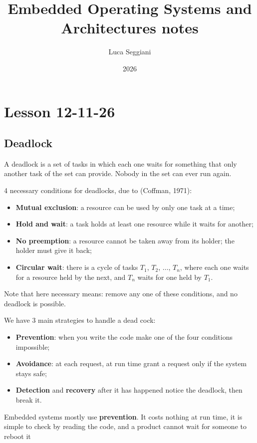 \documentclass[a4paper,11pt]{article}
\title{Embedded Operating Systems and Architectures notes}
\author{Luca Seggiani}
\date{2026}
\begin{document}
\section{Lesson 12-11-26}

\thispagestyle{empty}
\pagestyle{fancy}


\subsection{Deadlock}
A deadlock is a set of tasks in which each one waits for something that only another task of the set can provide.
Nobody in the set can ever run again.

4 necessary conditions for deadlocks, due to (Coffman, 1971):
\begin{itemize}
	\item \textbf{Mutual exclusion}: a resource can be used by only one task at a time;
	\item \textbf{Hold and wait}: a task holds at least one resource while it waits for another;
	\item \textbf{No preemption}: a resource cannot be taken away from its holder; the holder must give it back;
	\item \textbf{Circular wait}: there is a cycle of tasks $T_1$, $T_2$, $\dots$, $T_n$, where each one waits for a resource held by the next, and $T_n$ waits for one held by $T_1$.
\end{itemize}

Note that here necessary means: remove any one of these conditions, and no deadlock is possible.

\par\smallskip

We have 3 main strategies to handle a dead cock:
\begin{itemize}
	\item \textbf{Prevention}: when you write the code make one of the four conditions impossible;
	\item \textbf{Avoidance}: at each request, at run time grant a request only if the system stays safe;
	\item \textbf{Detection} and \textbf{recovery} after it has happened notice the deadlock, then break it.
\end{itemize}

Embedded systems mostly use \textbf{prevention}. It costs nothing at run time, it is simple to check by reading the code, and
a product cannot wait for someone to reboot it
\end{document}
